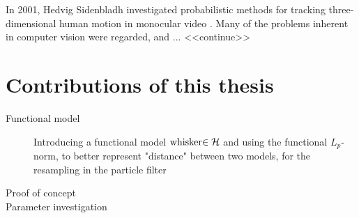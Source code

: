 In 2001, Hedvig Sidenbladh investigated probabilistic methods for tracking three-dimensional human motion in monocular video \cite{Hedvig}. 
Many of the problems inherent in computer vision were regarded, and ... <<continue>>

\section{Contributions of this thesis}

\begin{description}
    \item[Functional model] 
        Introducing a functional model $\text{whisker}{\in{\ensuremath{\mathcal{H}}}}$ and using the functional $L_p$-norm, 
        to better represent "distance" between two models, 
        for the resampling in the particle filter \\
    \item[Proof of concept]
        
    \item[Parameter investigation]
        

\end{description}



